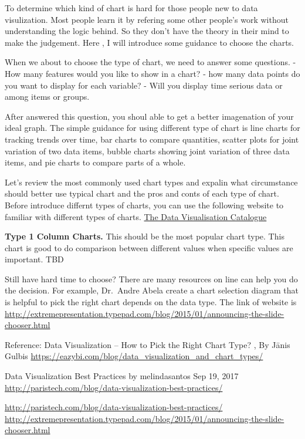 \documentclass[]{book}
\theoremstyle{definition}
\theoremstyle{definition}
\theoremstyle{definition}
\theoremstyle{remark}
\begin{document}
To determine which kind of chart is hard for those people new to data
visulization. Most people learn it by refering some other people's work
without understanding the logic behind. So they don't have the theory in
their mind to make the judgement. Here , I will introduce some guidance
to choose the charts.

When we about to choose the type of chart, we need to answer some
questions. - How many features would you like to show in a chart? - how
many data points do you want to display for each variable? - Will you
display time serious data or among items or groups.

After answered this question, you shoul able to get a better imagenation
of your ideal graph. The simple guidance for using different type of
chart is line charts for tracking trends over time, bar charts to
compare quantities, scatter plots for joint variation of two data items,
bubble charts showing joint variation of three data items, and pie
charts to compare parts of a whole.

Let's review the most commonly used chart types and expalin what
circumstance should better use typical chart and the pros and conts of
each type of chart. Before introduce differnt types of charts, you can
use the following website to familiar with different types of charts.
\href{https://datavizcatalogue.com/}{The Data Visualisation Catalogue}

\textbf{Type 1 Column Charts.} This should be the most popular chart
type. This chart is good to do comparison between different values when
specific values are important. TBD

Still have hard time to choose? There are many resources on line can
help you do the decision. For example, Dr.~Andre Abela create a chart
selection diagram that is helpful to pick the right chart depends on the
data type. The link of website is
\url{http://extremepresentation.typepad.com/blog/2015/01/announcing-the-slide-chooser.html}

Reference: Data Visualization -- How to Pick the Right Chart Type? , By
Jānis Gulbis
\url{https://eazybi.com/blog/data_visualization_and_chart_types/}

Data Visualization Best Practices by melindasantos \textbar{} Sep 19,
2017 \url{http://paristech.com/blog/data-visualization-best-practices/}

\url{http://paristech.com/blog/data-visualization-best-practices/}
\url{http://extremepresentation.typepad.com/blog/2015/01/announcing-the-slide-chooser.html}
\end{document}
